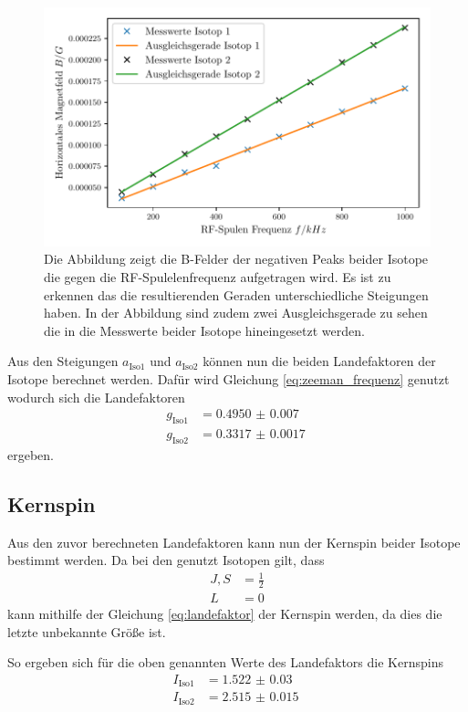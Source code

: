 \begin{figure}
    \centering
    \includegraphics[width=\textwidth]{content/plots/landefaktor.pdf}
    \caption{Die Abbildung zeigt die B-Felder der negativen Peaks beider Isotope die gegen die RF-Spulelenfrequenz aufgetragen wird.
    Es ist zu erkennen das die resultierenden Geraden unterschiedliche Steigungen haben.
    In der Abbildung sind zudem zwei Ausgleichsgerade zu sehen die in die Messwerte beider Isotope hineingesetzt werden.}
    \label{fig:lande}
\end{figure}
Aus den Steigungen $a_\text{Iso1}$ und $a_\text{Iso2}$ können nun die beiden Landefaktoren der Isotope berechnet werden.
Dafür wird Gleichung \eqref{eq:zeeman_frequenz} genutzt wodurch sich die Landefaktoren
\begin{align*}
    g_\text{Iso1} &= \SI{0.4950(70)}{}\\
    g_\text{Iso2} &= \SI{ 0.3317(17)}{}
\end{align*}
ergeben.
\subsection{Kernspin}
Aus den zuvor berechneten Landefaktoren kann nun der Kernspin beider Isotope bestimmt werden.
Da bei den genutzt Isotopen gilt, dass 
\begin{align*}
    J, S &= \frac{1}{2}\\
    L &= 0
\end{align*}
kann mithilfe der Gleichung \eqref{eq:landefaktor} der Kernspin werden, da dies die letzte unbekannte Größe ist.

So ergeben sich für die oben genannten Werte des Landefaktors die Kernspins 
\begin{align*}
    I_\text{Iso1} &= \SI{1.522(30)}{}\\
    I_\text{Iso2} &= \SI{2.515(15)}{}
\end{align*}

